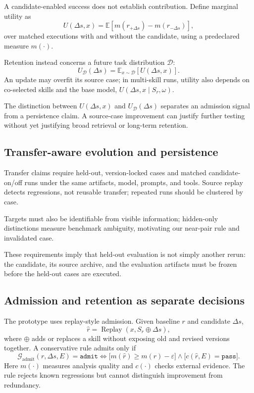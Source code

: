 \documentclass[11pt]{article}
\begin{document}
A candidate-enabled success does not establish contribution.  Define marginal utility as
\begin{equation}
    U(\Delta s, x) =
    \mathbb{E}\left[m(r_{+\Delta s}) - m(r_{-\Delta s})\right],
\end{equation}
over matched executions with and without the candidate, using a predeclared measure
$m(\cdot)$.

Retention instead concerns a future task distribution $\mathcal{D}$:
\begin{equation}
    U_{\mathcal{D}}(\Delta s)
    = \mathbb{E}_{x \sim \mathcal{D}}\left[U(\Delta s,x)\right].
\end{equation}
An update may overfit its source case; in multi-skill runs, utility also depends on
co-selected skills and the base model, $U(\Delta s,x\mid S_r,\omega)$.

The distinction between $U(\Delta s,x)$ and $U_{\mathcal D}(\Delta s)$ separates an
admission signal from a persistence claim.  A source-case improvement can justify further
testing without yet justifying broad retrieval or long-term retention.

\subsection{Transfer-aware evolution and persistence}

Transfer claims require held-out, version-locked cases and matched candidate-on/off runs
under the same artifacts, model, prompts, and tools.  Source replay detects regressions,
not reusable transfer; repeated runs should be clustered by case.

Targets must also be identifiable from visible information; hidden-only distinctions
measure benchmark ambiguity, motivating our near-pair rule and invalidated case.

These requirements imply that held-out evaluation is not simply another rerun: the
candidate, its source archive, and the evaluation artifacts must be frozen before the
held-out cases are executed.

\subsection{Admission and retention as separate decisions}

The prototype uses replay-style admission.  Given baseline $r$ and candidate $\Delta s$,
\begin{equation}
    \hat{r} = \operatorname{Replay}(x, S_r \oplus \Delta s),
\end{equation}
where $\oplus$ adds or replaces a skill without exposing old and revised versions
together.  A conservative rule admits only if
\begin{equation}
    \mathcal{G}_{\mathrm{admit}}(r, \Delta s, E) = \texttt{admit}
    \iff
    \bigl[m(\hat{r}) \geq m(r) - \varepsilon \bigr]
    \wedge
    \bigl[c(\hat{r},E)=\texttt{pass}\bigr].
\end{equation}
Here $m(\cdot)$ measures analysis quality and $c(\cdot)$ checks external evidence.  The
rule rejects known regressions but cannot distinguish improvement from redundancy.
\end{document}
